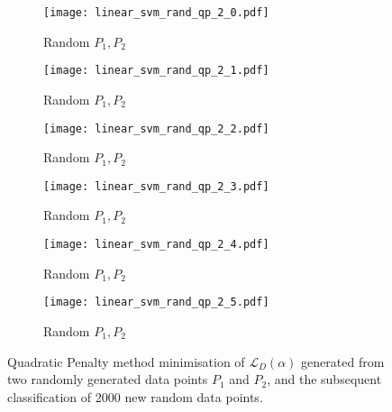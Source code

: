 \documentclass[10pt, a4paper,reqno]{amsart}
\begin{document}
\begin{figure}[H]
	\centering	
	\begin{subfigure}{0.5\textwidth}
		\centering
		\texttt{[image: linear\_svm\_rand\_qp\_2\_0.pdf]}
		\caption{Random $P_1, P_2$}
	\end{subfigure}%
	\begin{subfigure}{0.5\textwidth}
		\centering
		\texttt{[image: linear\_svm\_rand\_qp\_2\_1.pdf]}
		\caption{Random $P_1, P_2$}
	\end{subfigure}
	\begin{subfigure}{0.5\textwidth}
		\centering
		\texttt{[image: linear\_svm\_rand\_qp\_2\_2.pdf]}
		\caption{Random $P_1, P_2$}
	\end{subfigure}%
	\begin{subfigure}{0.5\textwidth}
		\centering
		\texttt{[image: linear\_svm\_rand\_qp\_2\_3.pdf]}
		\caption{Random $P_1, P_2$}
	\end{subfigure}
	\begin{subfigure}{0.5\textwidth}
		\centering
		\texttt{[image: linear\_svm\_rand\_qp\_2\_4.pdf]}
		\caption{Random $P_1, P_2$}
	\end{subfigure}%
	\begin{subfigure}{0.5\textwidth}
		\centering
		\texttt{[image: linear\_svm\_rand\_qp\_2\_5.pdf]}
		\caption{Random $P_1, P_2$}
	\end{subfigure}
	\caption{Quadratic Penalty method minimisation of $\mathcal{L}_D(\alpha)$ generated from two randomly generated data points $P_1$ and $P_2$, and the subsequent classification of 2000 new random data points.}
\end{figure}
\end{document}
